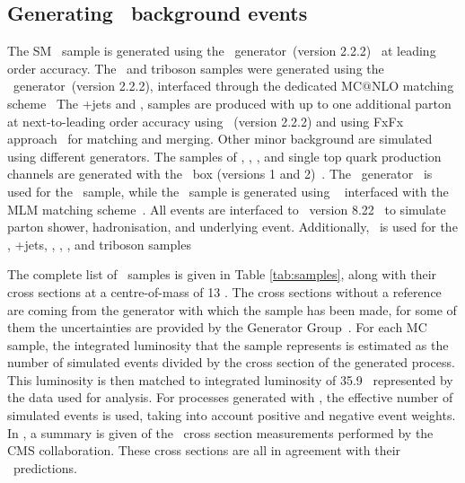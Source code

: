 \newpage
\subsection{Generating \SM\  background events}

The SM \tZq\ sample is generated using the \aMCMG\ generator~(version 2.2.2)~\cite{Alwall:1699128} at leading order accuracy. The \ttZ\ and triboson samples were generated using the \\\aMCMG\ generator~(version 2.2.2), interfaced through the dedicated MC${@}$NLO matching scheme~\cite{Frixione:2002ik} The \WZ+jets and \ttW, samples are produced with up to one additional parton at next-to-leading order accuracy using \aMCMG~(version 2.2.2) and using FxFx approach~\cite{Frederix:1481985} for matching and merging. Other minor background are simulated using different generators.  The samples of \ttH, \WW, \ZZ,  and single top quark  production channels are generated with the \Powheg\ box (versions 1 and 2)~\cite{Alioli2010,1126-6708-2009-09-111,1126-6708-2007-11-070,Alioli:2010xd,Frixione:2007vw,Nason:2004rx}. The \JHU\ generator~\cite{Gritsan:2016hjl,Anderson:2013afp,Bolognesi:2012mm,Gao:2010qx} is used for the \tqH\ sample, while the \tWZ\ sample is generated using \MG~\cite{Alwall:2011uj} interfaced with the MLM matching scheme~\cite{Alwall:2007fs}. All events are interfaced to \Pythia~version 8.22~\cite{Sjostrand:2014zea} to simulate parton shower, hadronisation, and underlying event. Additionally, \MS\ is used for the \tZq, \WZ+jets, \ttZ, \ttW, \tWZ, and triboson samples



The complete list of \SM\ samples is given in Table \ref{tab:samples}, along with their cross sections at a centre-of-mass of 13 \TeV. The cross sections without a reference are coming from the generator with which the sample has been made, for some of them the uncertainties are provided by the Generator Group~\cite{generator}. For each MC sample, the integrated luminosity that the sample represents is estimated as the number of simulated events divided by the cross section of the generated process. This luminosity is then matched to integrated luminosity of 35.9 \fbinv\ represented by the data used for analysis.  For processes generated with \aMCMG, the effective number of simulated events is used, taking into account positive and negative event weights. %
In , a summary is given of the \SM\ cross section measurements performed by the CMS collaboration. These cross sections are all in agreement with their \SM\ predictions. 

